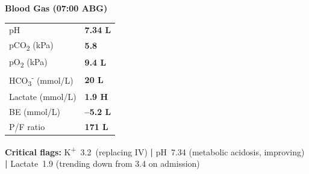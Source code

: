\documentclass[11pt,a4paper]{scrartcl}
\newcommand{\labrow}[2]{%
  {\footnotesize\sffamily\color{TextGray}#1} & {\footnotesize\sffamily\bfseries\color{MedNavy}#2}%
}
\begin{document}
\begin{tcolorbox}[sectionbox, title={\faFlask\enspace Laboratory Results — 07:00
  \hfill{\normalfont\tiny\color{white!70!MedTeal}
  \textbf{H} = High \quad \textbf{L} = Low \quad $\bullet$ = Critical}}]
\begin{minipage}[t]{0.32\linewidth}
    \textbf{\color{MedNavy}Blood Gas (07:00 ABG)}\par\vspace{2pt}
    \begin{tabular}{@{}ll@{}}
      \labrow{pH}{7.34 \textbf{L}} \\[2pt]
      \labrow{pCO\textsubscript{2} (kPa)}{5.8} \\[2pt]
      \labrow{pO\textsubscript{2} (kPa)}{9.4 \textbf{L}} \\[2pt]
      \labrow{HCO\textsubscript{3}\textsuperscript{-} (mmol/L)}{20 \textbf{L}} \\[2pt]
      \labrow{Lactate (mmol/L)}{1.9 \textbf{H}} \\[2pt]
      \labrow{BE (mmol/L)}{--5.2 \textbf{L}} \\[2pt]
      \labrow{P/F ratio}{171 \textbf{L}} \\
    \end{tabular}
  \end{minipage}

  \vspace{6pt}
  \noindent\colorbox{AlertRed!10!white}{\parbox{\linewidth-6pt}{%
    \textbf{\color{AlertRed}\faExclamationTriangle\enspace Critical flags:}\enspace
    K\textsuperscript{+}~3.2~(replacing IV) \textbf{|} pH~7.34 (metabolic acidosis, improving)
    \textbf{|} Lactate~1.9 (trending down from 3.4 on admission)
  }}

\end{tcolorbox}

\vspace{6pt}
\end{document}
